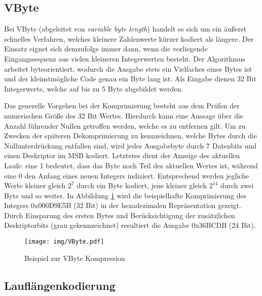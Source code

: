 \subsection{VByte}

Bei VByte \cite{Croft2009} (abgeleitet von \textit{variable byte length}) handelt es sich um ein äußerst schnelles Verfahren, welches kleinere Zahlenwerte kürzer kodiert als längere. Der Einsatz eignet sich demzufolge immer dann, wenn die vorliegende Eingangssequenz aus vielen kleineren Integerwerten besteht. Der Algorithmus arbeitet byteorientiert, wodurch die Ausgabe stets ein Vielfaches eines Bytes ist und der kleinstmögliche Code genau ein Byte lang ist. Als Eingabe dienen 32 Bit Integerwerte, welche auf bis zu 5 Byte abgebildet werden.

Das generelle Vorgehen bei der Komprimierung besteht aus dem Prüfen der numerischen Größe des 32 Bit Wertes. Hierdurch kann eine Aussage über die Anzahl führender Nullen getroffen werden, welche es zu entfernen gilt. Um zu Zwecken der späteren Dekomprimierung zu kennzeichnen, welche Bytes durch die Nullunterdrückung entfallen sind, wird jedes Ausgabebyte durch 7 Datenbits und einen Deskriptor im \acs{MSB} kodiert. Letzteres dient der Anzeige des aktuellen Laufs: eine 1 bedeutet, dass das Byte noch Teil des aktuellen Wertes ist, während eine 0 den Anfang eines neuen Integers indiziert. Entsprechend werden jegliche Werte kleiner gleich $2^7$ durch ein Byte kodiert, jene kleiner gleich $2^{14}$ durch zwei Byte und so weiter. In Abbildung \ref{fig:vbyte} wird die beispielhafte Komprimierung des Integers 0x000D9E5B (32 Bit) in der hexadezimalen Repräsentation gezeigt. Durch Einsparung des ersten Bytes und Berücksichtigung der zusätzlichen Deskriptorbits (grau gekennzeichnet) resultiert die Ausgabe 0x36BCDB (24 Bit).

\begin{figure}
	\texttt{[image: img/VByte.pdf]}
	\centering
	\caption{Beispiel zur VByte Kompression}
	\label{fig:vbyte}
\end{figure}

\subsection{Lauflängenkodierung}

